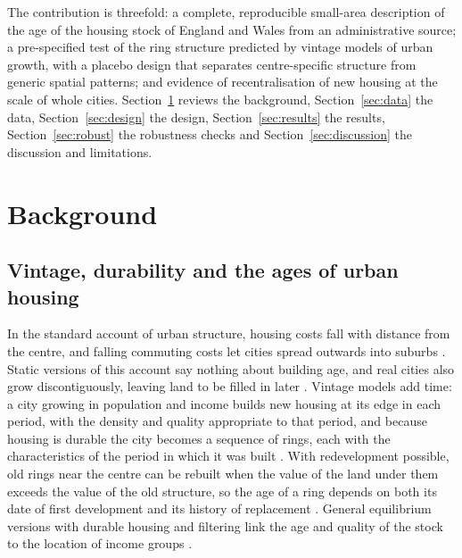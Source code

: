 The contribution is threefold: a complete, reproducible small-area description of the age of the housing stock of England and Wales from an administrative source; a pre-specified test of the ring structure predicted by vintage models of urban growth, with a placebo design that separates centre-specific structure from generic spatial patterns; and evidence of recentralisation of new housing at the scale of whole cities. Section~\ref{sec:lit} reviews the background, Section~\ref{sec:data} the data, Section~\ref{sec:design} the design, Section~\ref{sec:results} the results, Section~\ref{sec:robust} the robustness checks and Section~\ref{sec:discussion} the discussion and limitations.

\section{Background}
\label{sec:lit}
\subsection{Vintage, durability and the ages of urban housing}
In the standard account of urban structure, housing costs fall with distance from the centre, and falling commuting costs let cities spread outwards into suburbs \citep{ioannides2008}. Static versions of this account say nothing about building age, and real cities also grow discontiguously, leaving land to be filled in later \citep{rodriguez1986}. Vintage models add time: a city growing in population and income builds new housing at its edge in each period, with the density and quality appropriate to that period, and because housing is durable the city becomes a sequence of rings, each with the characteristics of the period in which it was built \citep{harrison1974,brueckner1980}. With redevelopment possible, old rings near the centre can be rebuilt when the value of the land under them exceeds the value of the old structure, so the age of a ring depends on both its date of first development and its history of replacement \citep{wheaton1982,braid2001}. General equilibrium versions with durable housing and filtering link the age and quality of the stock to the location of income groups \citep{arnott1999}.

